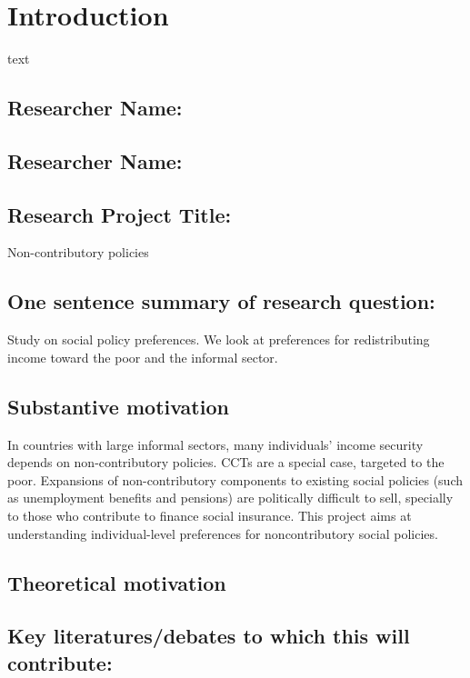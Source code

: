\documentclass{report}\usepackage[]{graphicx}\usepackage[]{color}
\begin{document}
\section{Introduction}
 text

\subsection*{Researcher Name:} 
\subsection*{Researcher Name:}
\subsection*{Research Project Title:}

Non-contributory policies

\subsection*{One sentence summary of research question: }

Study on social policy preferences. We look at preferences for redistributing income toward the poor and the informal sector.

\subsection*{Substantive motivation}

In countries with large informal sectors, many individuals' income security depends on non-contributory policies. CCTs are a special case, targeted to the poor. Expansions of non-contributory components to existing social policies (such as unemployment benefits and pensions) are politically difficult to sell, specially to those who contribute to finance social insurance. This project aims at understanding individual-level preferences for noncontributory social policies.

\subsection*{Theoretical motivation }


\subsection*{Key literatures/debates to which this will contribute:}
\end{document}
